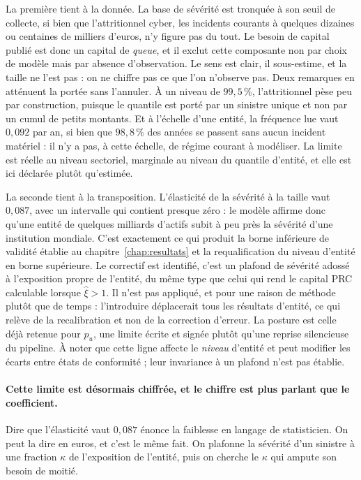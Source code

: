 La première tient à la donnée. La base de sévérité est tronquée à son seuil de collecte, si bien
que l'attritionnel cyber, les incidents courants à quelques dizaines ou centaines de
milliers d'euros, n'y figure pas du tout. Le besoin de capital publié est donc un capital de
\emph{queue}, et il exclut cette composante non par choix de modèle mais par absence
d'observation. Le sens est clair, il sous-estime, et la taille ne l'est pas : on ne chiffre pas
ce que l'on n'observe pas. Deux remarques en atténuent la portée sans l'annuler. À un niveau de
$99{,}5\,\%$, l'attritionnel pèse peu par construction, puisque le quantile est porté par un
sinistre unique et non par un cumul de petits montants. Et à l'échelle d'une entité, la
fréquence lue vaut $0{,}092$ par an, si bien que $98{,}8\,\%$ des années se passent sans aucun
incident matériel : il n'y a pas, à cette échelle, de régime courant à modéliser. La limite est
réelle au niveau sectoriel, marginale au niveau du quantile d'entité, et elle est ici déclarée
plutôt qu'estimée.

La seconde tient à la transposition. L'élasticité de la sévérité à la taille vaut $0{,}087$, avec
un intervalle qui contient presque zéro : le modèle affirme donc qu'une entité de quelques
milliards d'actifs subit à peu près la sévérité d'une institution mondiale. C'est exactement ce
qui produit la borne inférieure de validité établie au
chapitre~\ref{chap:resultats} et la requalification du niveau d'entité en borne supérieure. Le
correctif est identifié, c'est un plafond de sévérité adossé à l'exposition propre de
l'entité, du même type que celui qui rend le capital PRC calculable lorsque
$\hat\xi>1$. Il n'est pas appliqué, et pour une raison de méthode plutôt que de temps :
l'introduire déplacerait tous les résultats d'entité, ce qui relève de la recalibration et non
de la correction d'erreur. La posture est celle déjà retenue pour $p_u$, une limite écrite et
signée plutôt qu'une reprise silencieuse du pipeline. À noter que cette ligne affecte le
\emph{niveau} d'entité et peut modifier les écarts entre états de conformité ; leur invariance à un plafond n'est pas établie.

\paragraph{Cette limite est désormais chiffrée, et le chiffre est plus parlant que le
coefficient.} Dire que l'élasticité vaut $0{,}087$ énonce la faiblesse en langage de
statisticien. On peut la dire en euros, et c'est le même fait. On plafonne la sévérité d'un
sinistre à une fraction $\kappa$ de l'exposition de l'entité, puis on cherche le $\kappa$ qui
ampute son besoin de moitié.

